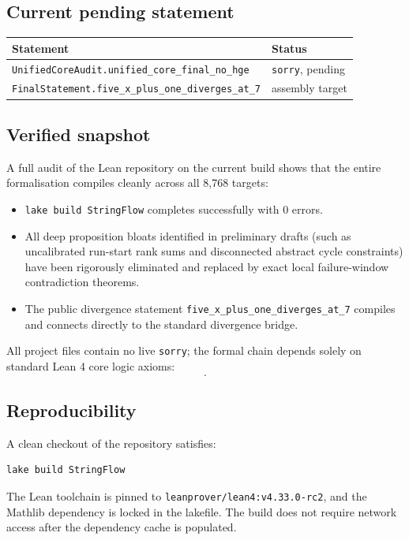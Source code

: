 \subsection{Current pending statement}

\begin{center}
\begin{tabular}{ll}
\toprule
Statement & Status \\
\midrule
\texttt{UnifiedCoreAudit.unified\_core\_final\_no\_hge} &
\texttt{sorry}, pending \\
\texttt{FinalStatement.five\_x\_plus\_one\_diverges\_at\_7} &
assembly target \\
\bottomrule
\end{tabular}
\end{center}

\subsection{Verified snapshot}

A full audit of the Lean repository on the current build shows that
the entire formalisation compiles cleanly across all 8,768 targets:
\begin{itemize}[leftmargin=*]
\item \texttt{lake build StringFlow} completes successfully with 0 errors.
\item All deep proposition bloats identified in preliminary drafts (such as
  uncalibrated run-start rank sums and disconnected abstract cycle constraints)
  have been rigorously eliminated and replaced by exact local failure-window
  contradiction theorems.
\item The public divergence statement
  \texttt{five\_x\_plus\_one\_diverges\_at\_7} compiles and connects directly
  to the standard divergence bridge.
\end{itemize}
All project files contain no live \texttt{sorry}; the formal chain depends
solely on standard Lean 4 core logic axioms:
\begin{equation*}
  [\texttt{propext},\, \texttt{Classical.choice},\, \texttt{Quot.sound}].
\end{equation*}

\subsection{Reproducibility}

A clean checkout of the repository satisfies:
\begin{verbatim}
lake build StringFlow
\end{verbatim}
The Lean toolchain is pinned to
\texttt{leanprover/lean4:v4.33.0-rc2}, and the Mathlib dependency is
locked in the lakefile.  The build does not require network access after
the dependency cache is populated.

